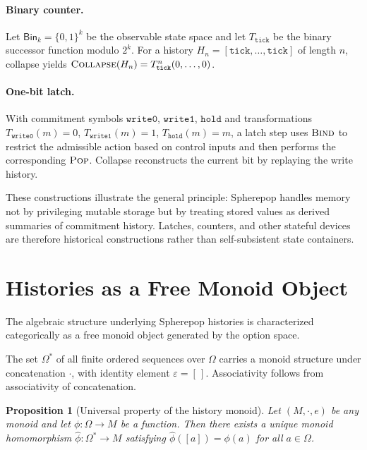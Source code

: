 \documentclass[12pt]{article}
\newtheorem{proposition}{Proposition}[section]
\newcommand{\Pop}{\operatorname{\textsc{Pop}}}
\newcommand{\Bind}{\operatorname{\textsc{Bind}}}
\newcommand{\Collapse}{\operatorname{\textsc{Collapse}}}
\newcommand{\Option}{\Omega}
\newcommand{\Seq}[1]{\left[#1\right]}
\newcommand{\Append}{\mathbin{\cdot}}
\begin{document}
\paragraph{Binary counter.} Let $\mathsf{Bin}_k = \{0,1\}^k$ be the observable state space and let $T_{\mathtt{tick}}$ be the binary successor function modulo $2^k$. For a history $H_n = \Seq{\mathtt{tick},\dots,\mathtt{tick}}$ of length $n$, collapse yields $\Collapse(H_n) = T_{\mathtt{tick}}^{n}(0,\dots,0)$.

\paragraph{One-bit latch.} With commitment symbols $\mathtt{write0}$, $\mathtt{write1}$, $\mathtt{hold}$ and transformations $T_{\mathtt{write0}}(m)=0$, $T_{\mathtt{write1}}(m)=1$, $T_{\mathtt{hold}}(m)=m$, a latch step uses $\Bind$ to restrict the admissible action based on control inputs and then performs the corresponding $\Pop$. Collapse reconstructs the current bit by replaying the write history.

These constructions illustrate the general principle: Spherepop handles memory not by privileging mutable storage but by treating stored values as derived summaries of commitment history. Latches, counters, and other stateful devices are therefore historical constructions rather than self-subsistent state containers.

\section{Histories as a Free Monoid Object}
\label{app:freemonoid}

The algebraic structure underlying Spherepop histories is characterized categorically as a free monoid object generated by the option space.

The set $\Option^*$ of all finite ordered sequences over $\Option$ carries a monoid structure under concatenation $\Append$, with identity element $\varepsilon = \Seq{\,}$. Associativity follows from associativity of concatenation.

\begin{proposition}[Universal property of the history monoid]
Let $(M,\cdot,e)$ be any monoid and let $\phi : \Option \to M$ be a function. Then there exists a unique monoid homomorphism $\widehat{\phi} : \Option^* \to M$ satisfying $\widehat{\phi}(\Seq{a}) = \phi(a)$ for all $a \in \Option$.
\end{proposition}
\end{document}
